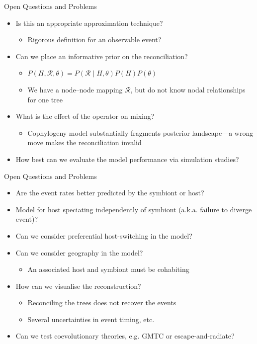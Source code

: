 \documentclass{beamer}
\newcommand{\R}{\ensuremath{\mathcal{R}}}
\begin{document}
\begin{frame}{Open Questions and Problems}

\begin{itemize}

\item Is this an appropriate approximation technique?
\begin{itemize}
\item Rigorous definition for an observable event?
\end{itemize}
\pause
\item Can we place an informative prior on the reconciliation?
\begin{itemize}
\item $P\left(H,\R,\theta\right) = P\left(\R\mid H,\theta\right)P\left(H\right)P\left(\theta\right)$
\item We have a node--node mapping $\R$, but do not know nodal relationships for one tree
\end{itemize}
\pause
\item What is the effect of the operator on mixing?
\begin{itemize}
\item Cophylogeny model substantially fragments posterior landscape---a wrong move makes the reconciliation invalid
\end{itemize}
\pause
\item How best can we evaluate the model performance via simulation studies?

\end{itemize}

\end{frame}

\begin{frame}{Open Questions and Problems}

\begin{itemize}

\item Are the event rates better predicted by the symbiont or host?
\pause
\item Model for host speciating independently of symbiont (a.k.a. failure to diverge event)?
\pause
\item Can we consider preferential host-switching in the model?
\pause
\item Can we consider geography in the model?
\begin{itemize}
\item An associated host and symbiont must be cohabiting
\end{itemize}
\pause
\item How can we visualise the reconstruction?
\begin{itemize}
\item Reconciling the trees does not recover the events
\item Several uncertainties in event timing, etc.
\end{itemize}
\pause
\item Can we test coevolutionary theories, e.g. GMTC or escape-and-radiate?

\end{itemize}

\end{frame}
\end{document}

